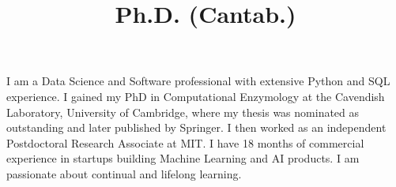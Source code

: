 \documentclass[11pt,a4paper,sans]{moderncv}        %
\title{Ph.D. (Cantab.)}                               %
\begin{document}
\makecvtitle
\vspace*{-1.2cm}
%
I am a Data Science and Software professional with extensive Python and SQL experience. 
%
%
%
%
%
I gained my PhD in Computational Enzymology at the Cavendish Laboratory, University of Cambridge, where my thesis was nominated as outstanding and later published by Springer.
%
I then worked as an independent Postdoctoral Research Associate at MIT.  I have 18 months of commercial experience in startups building Machine Learning and AI products.
%
I am passionate about continual and lifelong learning.
%
%
%
\vspace*{-0.5cm}
\end{document}
